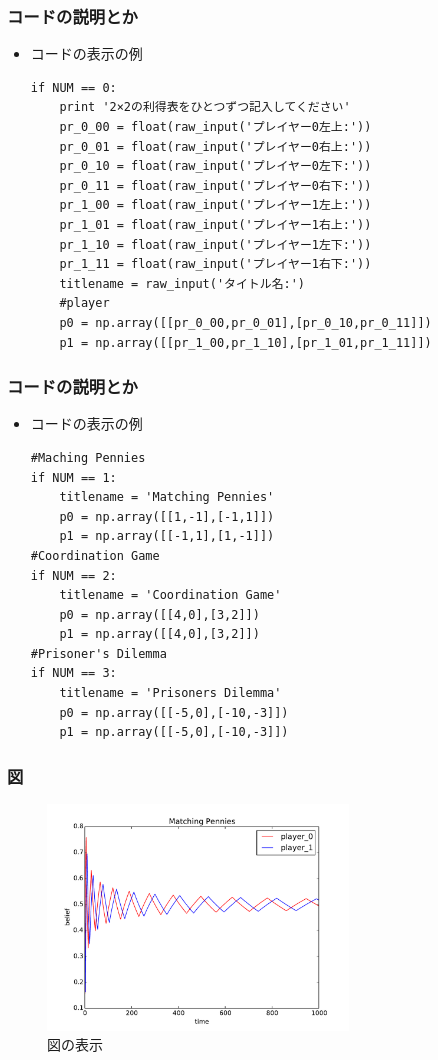 \documentclass[dvipdfmx,fleqn,handout]{beamer}
\begin{document}
\begin{frame}[fragile]%
\frametitle{コードの説明とか}
\begin{itemize}\setlength{\parskip}{0.5em}
\item
コードの表示の例
\begin{verbatim}
if NUM == 0:
    print '2×2の利得表をひとつずつ記入してください'
    pr_0_00 = float(raw_input('プレイヤー0左上:'))
    pr_0_01 = float(raw_input('プレイヤー0右上:'))
    pr_0_10 = float(raw_input('プレイヤー0左下:'))
    pr_0_11 = float(raw_input('プレイヤー0右下:'))
    pr_1_00 = float(raw_input('プレイヤー1左上:'))
    pr_1_01 = float(raw_input('プレイヤー1右上:'))
    pr_1_10 = float(raw_input('プレイヤー1左下:'))
    pr_1_11 = float(raw_input('プレイヤー1右下:'))
    titlename = raw_input('タイトル名:')
    #player
    p0 = np.array([[pr_0_00,pr_0_01],[pr_0_10,pr_0_11]])
    p1 = np.array([[pr_1_00,pr_1_10],[pr_1_01,pr_1_11]])
\end{verbatim}
\end{itemize}
\end{frame}

\begin{frame}[fragile]%
\frametitle{コードの説明とか}
\begin{itemize}\setlength{\parskip}{0.5em}
\item
コードの表示の例
\begin{verbatim}
#Maching Pennies
if NUM == 1:
    titlename = 'Matching Pennies'
    p0 = np.array([[1,-1],[-1,1]])
    p1 = np.array([[-1,1],[1,-1]])
#Coordination Game
if NUM == 2:
    titlename = 'Coordination Game'
    p0 = np.array([[4,0],[3,2]])
    p1 = np.array([[4,0],[3,2]])
#Prisoner's Dilemma
if NUM == 3:
    titlename = 'Prisoners Dilemma'
    p0 = np.array([[-5,0],[-10,-3]])
    p1 = np.array([[-5,0],[-10,-3]])
\end{verbatim}
\end{itemize}
\end{frame}

\begin{frame}
\frametitle{図}
\begin{figure}
 \centering
 \includegraphics[width=80mm]{matchingpennies_plot.pdf}
 \caption{図の表示}
 \label{fig:matchingpennies_plot}
\end{figure}
\end{frame}
\end{document}
